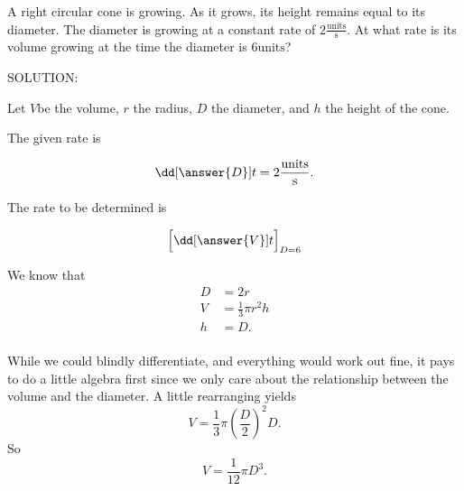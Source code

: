 \documentclass{ximera}
\author{Steven Gubkin\and Nela Lakos}
\begin{document}
\begin{exercise}

A right circular cone is growing.  As it grows, its height remains
equal to its diameter. The diameter is growing at a constant rate of
$2 \frac{\textrm{units}}{\textrm{s}}$. At what rate is its volume
growing at the time the diameter is $6 \textrm{units}$?


SOLUTION: 

 Let $V$be the volume, $r$ the radius, $D$ the diameter,  and $h$ the height  of the cone.


The given rate is

 \[
 \dd[\answer{D}]{t}= 2 \frac{\textrm{units}}{\textrm{s}}.
  \]
  
  The rate to be determined is
  
   \[
 \Bigl[ \dd[\answer{V}]{t} \Bigr]_{D=6}
  \]

\begin{hint}
\begin{image}
\end{image}
\end{hint}


\begin{hint}
We know that
\begin{align*}
	D &= 2r\\
	V &= \frac{1}{3} \pi r^2 h\\
	h &= D.\\
\end{align*}
\end{hint}
\begin{hint}
  While we could blindly differentiate, and everything would work out
  fine, it pays to do a little algebra first since we only care about
  the relationship between the volume and the diameter.  A little
  rearranging yields
\[
V = \frac{1}{3} \pi \left(\frac{D}{2}\right)^2D.
\]
So
\[
V = \frac{1}{12} \pi D^3.
\]
\end{hint}


\end{exercise}
\end{document}
